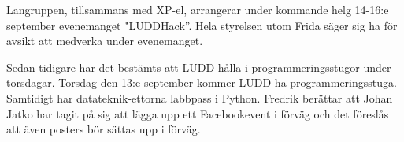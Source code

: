 \documentclass{protokoll}
\begin{document}
Langruppen, tillsammans med XP-el, arrangerar under kommande helg 14-16:e september evenemanget "LUDDHack''. Hela styrelsen utom Frida säger sig ha för avsikt att medverka under evenemanget.

Sedan tidigare har det bestämts att LUDD hålla i programmeringsstugor under torsdagar.  
Torsdag den 13:e september kommer LUDD ha programmeringsstuga. Samtidigt har datateknik-ettorna labbpass i Python. Fredrik berättar att Johan Jatko har tagit på sig att lägga upp ett Facebookevent i förväg och det föreslås att även posters bör sättas upp i förväg. 
\end{document}
